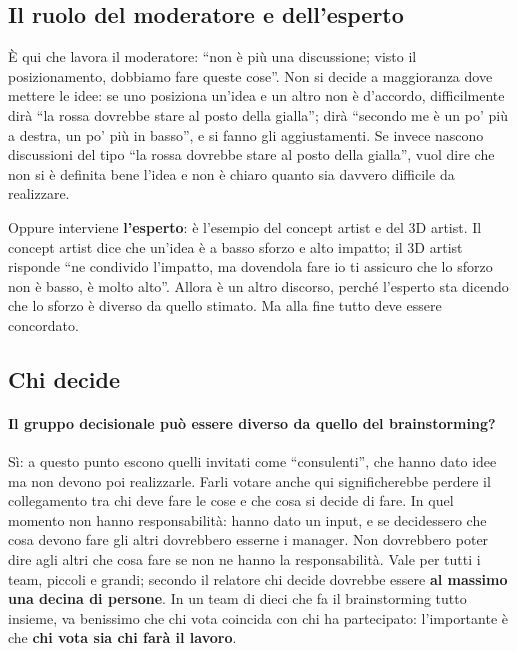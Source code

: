 \subsection{Il ruolo del moderatore e dell'esperto}

È qui che lavora il moderatore: ``non è più una discussione; visto il posizionamento,
dobbiamo fare queste cose''. Non si decide a maggioranza dove mettere le idee: se uno
posiziona un'idea e un altro non è d'accordo, difficilmente dirà ``la rossa dovrebbe stare
al posto della gialla''; dirà ``secondo me è un po' più a destra, un po' più in basso'', e
si fanno gli aggiustamenti. Se invece nascono discussioni del tipo ``la rossa dovrebbe
stare al posto della gialla'', vuol dire che non si è definita bene l'idea e non è chiaro
quanto sia davvero difficile da realizzare.

Oppure interviene \textbf{l'esperto}: è l'esempio del concept artist e del 3D artist. Il
concept artist dice che un'idea è a basso sforzo e alto impatto; il 3D artist risponde ``ne
condivido l'impatto, ma dovendola fare io ti assicuro che lo sforzo non è basso, è molto
alto''. Allora è un altro discorso, perché l'esperto sta dicendo che lo sforzo è diverso
da quello stimato. Ma alla fine tutto deve essere concordato.

\subsection{Chi decide}

\paragraph{Il gruppo decisionale può essere diverso da quello del brainstorming?} Sì: a
questo punto escono quelli invitati come ``consulenti'', che hanno dato idee ma non devono
poi realizzarle. Farli votare anche qui significherebbe perdere il collegamento tra chi
deve fare le cose e che cosa si decide di fare. In quel momento non hanno responsabilità:
hanno dato un input, e se decidessero che cosa devono fare gli altri dovrebbero esserne
i manager. Non dovrebbero poter dire agli altri che cosa fare se non ne hanno la
responsabilità. Vale per tutti i team, piccoli e grandi; secondo il relatore chi decide
dovrebbe essere \textbf{al massimo una decina di persone}. In un team di dieci che fa il
brainstorming tutto insieme, va benissimo che chi vota coincida con chi ha partecipato:
l'importante è che \textbf{chi vota sia chi farà il lavoro}.


